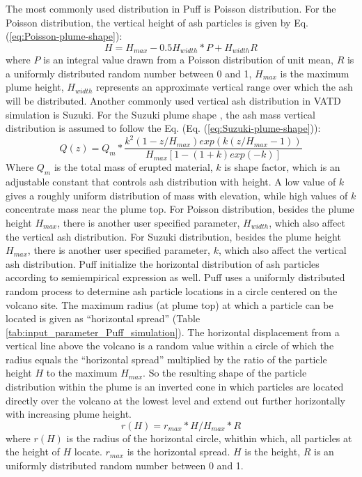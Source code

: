 \documentclass[utf8]{frontiersSCNS} %
\begin{document}
The most commonly used distribution in Puff is Poisson distribution. For the Poisson distribution, the vertical height of ash particles is given by Eq. (\ref{eq:Poisson-plume-shape}):
\begin{equation}
H=H_{max} - 0.5 H_{width}*P+H_{width}R
\label{eq:Poisson-plume-shape}
\end{equation}
where $P$ is an integral value drawn from a Poisson distribution of unit mean, $R$ is a uniformly distributed random number between 0 and 1, $H_{max}$ is the maximum plume height, $H_{width}$ represents an approximate vertical range over which the ash will be distributed.
Another commonly used vertical ash distribution in VATD simulation is Suzuki. For the Suzuki plume shape \citep{suzuki1983theoretical}, the ash mass vertical distribution is assumed to follow the Eq. (Eq. (\ref{eq:Suzuki-plume-shape})):
\begin{equation}
Q(z)=Q_m* \frac{k^2(1-z/H_{max})exp\left(k(z/H_{max} -1 )\right)}{H_{max}\left[1-(1+k)exp(-k)\right]}
\label{eq:Suzuki-plume-shape}
\end{equation}
Where $Q_m$ is the total mass of erupted material, $k$ is shape factor, which is an adjustable constant that controls ash distribution with height. A low value of $k$ gives a roughly uniform distribution of mass with elevation, while high values of $k$ concentrate mass near the plume top.
For Poisson distribution, besides the plume height $H_{max}$, there is another user specified parameter, $H_{width}$, which also affect the vertical ash distribution. For Suzuki distribution, besides the plume height $H_{max}$, there is another user specified parameter, $k$, which also affect the vertical ash distribution.
Puff initialize the horizontal distribution of ash particles according to semiempirical expression as well. Puff uses a uniformly distributed random process to determine ash particle locations in a circle centered on the volcano site. The maximum radius (at plume top) at which a particle can be located is given as ``horizontal spread'' (Table \ref{tab:input_parameter_Puff_simulation}). The horizontal displacement from a vertical line above the volcano is a random value within a circle of which the radius equals the ``horizontal spread'' multiplied by the ratio of the particle height $H$ to the maximum $H_{max}$. So the resulting shape of the particle distribution within the plume is an inverted cone in which particles are located directly over the volcano at the lowest level and extend out further horizontally with increasing plume height.
\begin{equation}
r(H)= r_{max} * H / H_{max} * R
\label{eq:horizontal-particle-distribution} 
\end{equation}
where $r(H)$ is the radius of the horizontal circle, whithin which, all particles at the height of $H$ locate. $r_{max}$ is the horizontal spread. $H$ is the height, $R$ is an uniformly distributed random number between 0 and 1.
\end{document}

